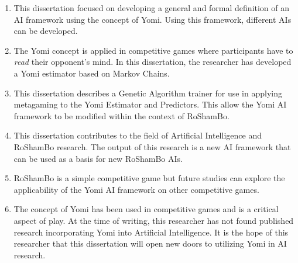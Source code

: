 \begin{enumerate}[leftmargin=0em, itemindent=1.8em]
{\begin{enumerate}[label*=\arabic*., leftmargin=0em,  listparindent=3em]
\begin{enumerate}[label=\arabic*.]
\item This dissertation focused on developing a general and formal definition of an AI framework using the concept of Yomi. Using this framework, different AIs can be developed.
\item The Yomi concept is applied in competitive games where participants have to \textit{read} their opponent's mind. In this dissertation, the researcher has developed a Yomi estimator based on Markov Chains.
\item This dissertation describes a Genetic Algorithm trainer for use in applying metagaming to the Yomi Estimator and Predictors. This allow the Yomi AI framework to be modified within the context of RoShamBo.
\item This dissertation contributes to the field of Artificial Intelligence and RoShamBo research. The output of this research is a new AI framework that can be used as a basis for new RoShamBo AIs. 
\item RoShamBo is a simple competitive game but future studies can explore the applicability of the Yomi AI framework on other competitive games.
\item The concept of Yomi has been used in competitive games and is a critical aspect of play. At the time of writing, this researcher has not found published research incorporating Yomi into Artificial Intelligence. It is the hope of this researcher that this dissertation will open new doors to utilizing Yomi in AI research.
\end{enumerate}

\end{enumerate}
}
\end{enumerate}


